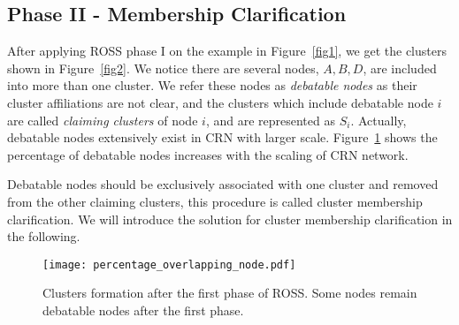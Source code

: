 \subsection{Phase II - Membership Clarification}
After applying ROSS phase I on the example in Figure~\ref{fig1}, we get the clusters shown in Figure~\ref{fig2}.
We notice there are several nodes, \ie $A, B, D$, are included into more than one cluster. 
We refer these nodes as \textit{debatable nodes} as their cluster affiliations are not clear, and the clusters which include debatable node $i$ are called \textit{claiming clusters} of node $i$, and are represented as $S_i$.  
Actually, debatable nodes extensively exist in CRN with larger scale.
Figure~\ref{percentage_overlapping_node} shows the percentage of debatable nodes increases with the scaling of CRN network.

Debatable nodes should be exclusively associated with one cluster and removed from the other claiming clusters, this procedure is called cluster membership clarification.
We will introduce the solution for cluster membership clarification in the following.

\begin{figure}[ht!]
  \centering
  \texttt{[image: percentage\_overlapping\_node.pdf]}
  \caption{Clusters formation after the first phase of ROSS. Some nodes remain debatable nodes after the first phase.}\label{percentage_overlapping_node}
\end{figure}





%

